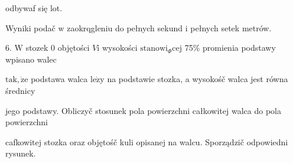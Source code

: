 \documentclass[a4paper,12pt]{article}
\begin{document}
odbywaf się lot.

Wyniki podač $\mathrm{w}$ zaokrqgleniu do pełnych sekund $\mathrm{i}$ pełnych setek metrów.

6. $\mathrm{W}$ stozek $0$ objętości $V\mathrm{i}$ wysokości $\mathrm{s}\mathrm{t}\mathrm{a}\mathrm{n}\mathrm{o}\mathrm{w}\mathrm{i}_{\Phi}\mathrm{c}\mathrm{e}\mathrm{j}$ 75\% promienia podstawy wpisano walec

$\mathrm{t}\mathrm{a}\mathrm{k}, \dot{\mathrm{z}}\mathrm{e}$ podstawa walca $\mathrm{l}\mathrm{e}\dot{\mathrm{z}}\mathrm{y}$ na podstawie stozka, a wysokośč walca jest równa średnicy

jego podstawy. Obliczyč stosunek pola powierzchni całkowitej walca do pola powierzchni

cafkowitej stozka oraz objętośč kuli opisanej na walcu. Sporządzič odpowiedni rysunek.
\end{document}
